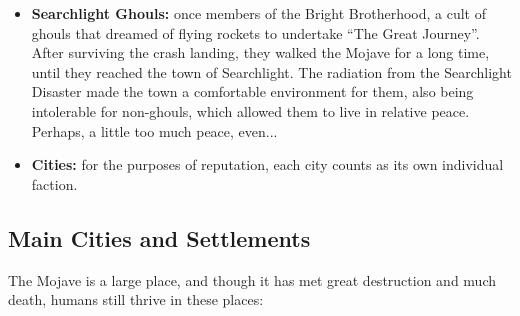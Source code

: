 \begin{itemize}
\item \textbf{Searchlight Ghouls:} once members of the Bright Brotherhood, a cult of ghouls that dreamed of flying rockets to undertake ``The Great Journey''. After surviving the crash landing, they walked the Mojave for a long time, until they reached the town of Searchlight. The radiation from the Searchlight Disaster made the town a comfortable environment for them, also being intolerable for non-ghouls, which allowed them to live in relative peace. Perhaps, a little too much peace, even...

\item \textbf{Cities:} for the purposes of reputation, each city counts as its own individual faction.
\end{itemize}

\subsection{Main Cities and Settlements}

The Mojave is a large place, and though it has met great destruction and much death, humans still thrive in these places:

